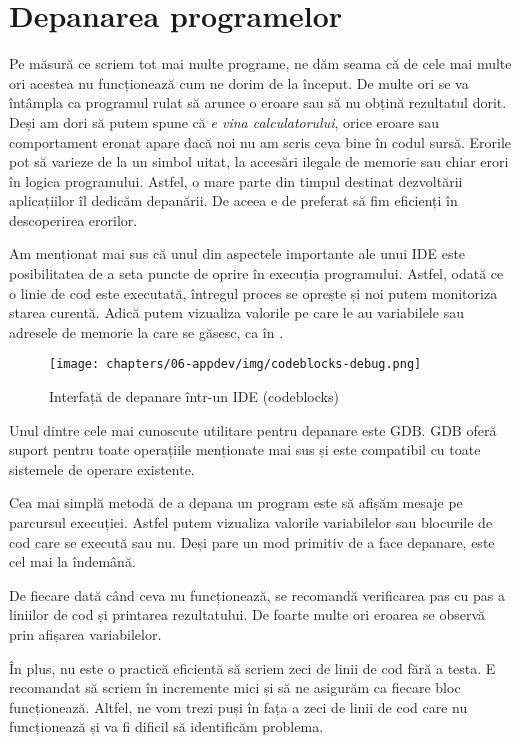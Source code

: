 \section{Depanarea programelor}
\label{sec:appdev:debug}

Pe măsură ce scriem tot mai multe programe, ne dăm seama că de cele mai multe
ori acestea nu funcționează cum ne dorim de la început. De multe ori se va
întâmpla ca programul rulat să arunce o eroare sau să nu obțină rezultatul
dorit. Deși am dori să putem spune că \textit{e vina calculatorului}, orice
eroare sau comportament eronat apare dacă noi nu am scris ceva bine în codul
sursă. Erorile pot să varieze de la un simbol uitat,
la accesări ilegale de memorie sau chiar erori în logica programului. Astfel, o
mare parte din timpul destinat dezvoltării aplicațiilor îl dedicăm depanării. De
aceea e de preferat să fim eficienți în descoperirea erorilor.

Am menționat mai sus că unul din aspectele importante ale unui IDE este
posibilitatea de a seta puncte de oprire în execuția programului. Astfel, odată
ce o linie de cod este executată, întregul proces se oprește și noi putem
monitoriza starea curentă. Adică putem vizualiza valorile pe care le au
variabilele sau adresele de memorie la care se găsesc, ca în .

\begin{figure}[!htbp]
  \centering
  \texttt{[image: chapters/06-appdev/img/codeblocks-debug.png]}
  \caption{Interfață de depanare într-un IDE (codeblocks)}
  \label{fig:appdev:ide-debug}
\end{figure}

Unul dintre cele mai cunoscute utilitare pentru depanare este GDB. GDB oferă suport pentru
toate operațiile menționate mai sus și este compatibil cu toate sistemele de
operare existente.

Cea mai simplă metodă de a depana un program este să afișăm mesaje pe parcursul
execuției. Astfel putem vizualiza valorile variabilelor sau blocurile de cod
care se execută sau nu. Deși pare un mod primitiv de a face depanare, este cel
mai la îndemână.

De fiecare dată când ceva nu funcționează, se recomandă verificarea pas cu pas a
liniilor de cod și printarea rezultatului. De foarte multe ori eroarea se
observă prin afișarea variabilelor.

În plus, nu este o practică eficientă să scriem zeci de linii de cod fără a
testa. E recomandat să scriem în incremente mici și să ne asigurăm ca fiecare
bloc funcționează. Altfel, ne vom trezi puși în fața a zeci de linii de cod care
nu funcționează și va fi dificil să identificăm problema.

